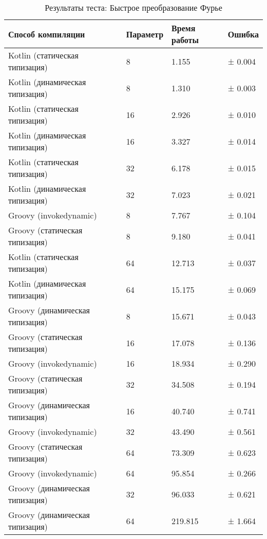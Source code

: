 \begin{table}[h]
\caption{\label{tab:fftResults}Результаты теста: Быстрое преобразование Фурье}
\begin{center}
\begin{tabular}{|l|l|l|l|}
\hline
Способ компиляции & Параметр	& Время работы & Ошибка \\
\hline
Kotlin (статическая типизация)           &  8 &   1.155 & ± 0.004 \\
Kotlin (динамическая типизация)          &  8 &   1.310 & ± 0.003 \\
Kotlin (статическая типизация)           & 16 &   2.926 & ± 0.010 \\
Kotlin (динамическая типизация)          & 16 &   3.327 & ± 0.014 \\
Kotlin (статическая типизация)           & 32 &   6.178 & ± 0.015 \\
Kotlin (динамическая типизация)          & 32 &   7.023 & ± 0.021 \\
Groovy (invokedynamic)                   &  8 &   7.767 & ± 0.104 \\
Groovy (статическая типизация)           &  8 &   9.180 & ± 0.041 \\
Kotlin (статическая типизация)           & 64 &  12.713 & ± 0.037 \\
Kotlin (динамическая типизация)          & 64 &  15.175 & ± 0.069 \\
Groovy (динамическая типизация)          &  8 &  15.671 & ± 0.043 \\
Groovy (статическая типизация)           & 16 &  17.078 & ± 0.136 \\
Groovy (invokedynamic)                   & 16 &  18.934 & ± 0.290 \\
Groovy (статическая типизация)           & 32 &  34.508 & ± 0.194 \\
Groovy (динамическая типизация)          & 16 &  40.740 & ± 0.741 \\
Groovy (invokedynamic)                   & 32 &  43.490 & ± 0.561 \\
Groovy (статическая типизация)           & 64 &  73.309 & ± 0.623 \\
Groovy (invokedynamic)                   & 64 &  95.854 & ± 0.266 \\
Groovy (динамическая типизация)          & 32 &  96.033 & ± 0.621 \\
Groovy (динамическая типизация)          & 64 & 219.815 & ± 1.664 \\
\hline
\end{tabular}
\end{center}
\end{table} 

